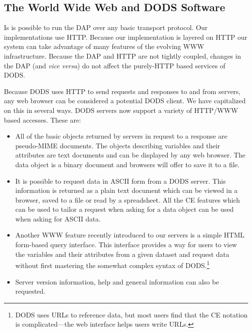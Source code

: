 \documentclass[10pt]{article}
\begin{document}
\subsection{The World Wide Web and DODS Software}

Is is possible to run the DAP over any basic transport protocol. Our
implementations use HTTP. Because our implementation is layered on HTTP our
system can take advantage of many features of the evolving WWW
infrastructure. Because the DAP and HTTP are not tightly coupled, changes in
the DAP (and \emph{vice versa}) do not affect the purely-HTTP based services
of DODS.

Because DODS uses HTTP to send requests and responses to and from servers,
any web browser can be considered a potential DODS client. We have capitalized
on this in several ways. DODS servers now support a variety of HTTP/WWW
based accesses. These are:
\begin{itemize}
\item All of the basic objects returned by servers in request to a response
  are pseudo-MIME\cite{rfc:mime} documents. The objects describing variables
  and their attributes are text documents and can be displayed by any web
  browser. The data object is a binary document and browsers will offer to
  save it to a file.

\item It is possible to request data in ASCII form from a DODS server. This
information is returned as a plain text document which can be viewed in a
browser, saved to a file or read by a spreadsheet. All the CE features which
can be used to tailor a request when asking for a data object can be used
when asking for ASCII data.

\item Another WWW feature recently introduced to our servers is a simple HTML
form-based query interface. This interface provides a way for users to view
the variables and their attributes from a given dataset and request data
without first mastering the somewhat complex syntax of DODS.\footnote{DODS
uses URLs to reference data, but most users find that the CE notation is
complicated---the web interface helps users write URLs.}

\item Server version information, help and general information can also be
requested.
\end{itemize}
\end{document}
